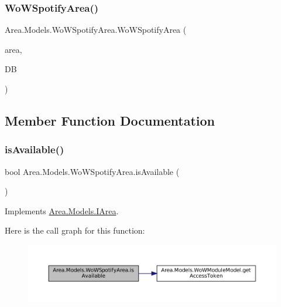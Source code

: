 \subsubsection{\texorpdfstring{Wo\+W\+Spotify\+Area()}{WoWSpotifyArea()}}
{\footnotesize\ttfamily Area.\+Models.\+Wo\+W\+Spotify\+Area.\+Wo\+W\+Spotify\+Area (\begin{DoxyParamCaption}\item[{\mbox{\hyperlink{classArea_1_1Models_1_1AREA}{A\+R\+EA}}}]{area,  }\item[{\mbox{\hyperlink{classArea_1_1DAT_1_1AreaDbContext}{Area\+Db\+Context}}}]{DB }\end{DoxyParamCaption})\hspace{0.3cm}{\ttfamily [inline]}}



\subsection{Member Function Documentation}
\mbox{\label{classArea_1_1Models_1_1WoWSpotifyArea_a577046acb0b4537ab57367893dfee2c0}} 
\subsubsection{\texorpdfstring{is\+Available()}{isAvailable()}}
{\footnotesize\ttfamily bool Area.\+Models.\+Wo\+W\+Spotify\+Area.\+is\+Available (\begin{DoxyParamCaption}{ }\end{DoxyParamCaption})\hspace{0.3cm}{\ttfamily [inline]}}



Implements \mbox{\hyperlink{interfaceArea_1_1Models_1_1IArea_a742b324f0d7573f7f99f9e2adb5df94c}{Area.\+Models.\+I\+Area}}.

Here is the call graph for this function\+:
\nopagebreak
\begin{figure}[H]
\begin{center}
\leavevmode
\includegraphics[width=350pt]{classArea_1_1Models_1_1WoWSpotifyArea_a577046acb0b4537ab57367893dfee2c0_cgraph}
\end{center}
\end{figure}
\mbox{\label{classArea_1_1Models_1_1WoWSpotifyArea_a2920b3707f791839a3ec17d9ab45f3df}} 
